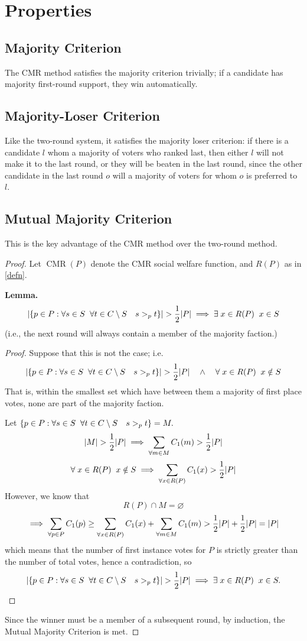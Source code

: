 \documentclass{article}
\DeclareMathOperator{\cmr}{CMR}
\begin{document}
\section{Properties}
\subsection{Majority Criterion}
The CMR method satisfies the majority criterion trivially; if a candidate has majority first-round support, they win automatically.
\subsection{Majority-Loser Criterion}
Like the two-round system, it satisfies the majority loser criterion: if there is a candidate $l$ whom a majority of voters who ranked last, then either $l$ will not make it to the last round, or they will be beaten in the last round, since the other candidate in the last round $o$ will a majority of voters for whom $o$ is preferred to $l$.
\subsection{Mutual Majority Criterion}
This is the key advantage of the CMR method over the two-round method. 

\begin{proof}
Let $\cmr(P)$ denote the CMR social welfare function, and $R(P)$ as in \ref{defn}.

\textbf{Lemma.}
\[\abs{\qty{p \in P : \forall s \in S \;\; \forall t \in C\setminus S \quad s >_p t}} > \frac{1}{2}\abs{P} \implies \exists\; x \in R(P) \;\; x\in S\]
(i.e., the next round will always contain a member of the majority faction.)
\begin{proof}
Suppose that this is not the case; i.e.
\[\abs{\qty{p \in P : \forall s \in S \;\; \forall t \in C\setminus S \quad s >_p t}} > \frac{1}{2}\abs{P} \quad \land \quad \forall\; x \in R(P) \;\; x\notin S\]
That is, within the smallest set which have between them a majority of first place votes, none are part of the majority faction.

Let $\qty{p \in P : \forall s \in S \;\; \forall t \in C\setminus S \quad s >_p t} = M.$
\[\abs{M} > \frac{1}{2}\abs{P} \implies \sum_{\forall m \in M} C_1(m) > \frac{1}{2}\abs{P}\] %
\[\forall\; x \in R(P) \;\; x\notin S \implies \sum_{\forall x\in R(P)} C_1(x) > \frac{1}{2}\abs{P}\] 
However, we know that
\[ R(P) \cap M = \varnothing \]\[
\implies \sum_{\forall p\in P} C_1(p) \geq \sum_{\forall x\in R(P)} C_1(x) + \sum_{\forall m \in M} C_1(m) > \frac{1}{2}\abs{P} + \frac{1}{2}\abs{P} = \abs{P} \]
which means that the number of first instance votes for $P$ is strictly greater than the number of total votes, hence a contradiction, so 
\[\abs{\qty{p \in P : \forall s \in S \;\; \forall t \in C\setminus S \quad s >_p t}} > \frac{1}{2}\abs{P} \implies \exists\; x \in R(P) \;\; x\in S.\]
\end{proof}
Since the winner must be a member of a subsequent round, by induction, the Mutual Majority Criterion is met. %
\end{proof}
\end{document}

